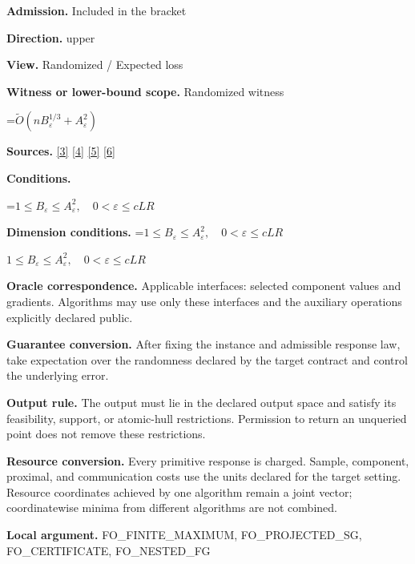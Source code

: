 \documentclass[10pt,a4paper]{article}
\newcommand{\AtlasMath}[1]{\par\begingroup\centering\setbox0=\hbox{$\displaystyle #1$}\ifdim\wd0>1.4\linewidth\typeout{ATLAS WIDE FORMULA: \the\wd0}\fi\ifdim\wd0>\linewidth\resizebox{\linewidth}{!}{\box0}\else\box0\fi\par\endgroup}
\newcommand{\AtlasInlineMath}[1]{\begingroup\setbox0=\hbox{$#1$}\ifdim\wd0>.4\linewidth\endgroup\AtlasMath{#1}\else\endgroup$#1$\fi}
\begin{document}
\textbf{Admission.} Included in the bracket



\textbf{Direction.} upper



\textbf{View.} Randomized / Expected loss



\textbf{Witness or lower-bound scope.} Randomized witness



\AtlasMath{\widetilde{O}(nB_\varepsilon^{1/3}+A_\varepsilon^2)}


\textbf{Sources.} \href{https://arxiv.org/pdf/2311.10886}{[3]} \href{https://arxiv.org/pdf/1405.4980}{[4]} \href{https://www2.isye.gatech.edu/~nemirovs/MOR_AccuracyCertificates.pdf}{[5]} \href{https://arxiv.org/pdf/2609.20701}{[6]}



\textbf{Conditions.}
\AtlasMath{1\le B_\varepsilon\le A_\varepsilon^2,\quad0<\varepsilon\le cLR}




\textbf{Dimension conditions.} \AtlasInlineMath{1\le B_\varepsilon\le A_\varepsilon^2,\quad0<\varepsilon\le cLR}



\textbf{Oracle correspondence.} Applicable interfaces: selected component values and gradients. Algorithms may use only these interfaces and the auxiliary operations explicitly declared public.



\textbf{Guarantee conversion.} After fixing the instance and admissible response law, take expectation over the randomness declared by the target contract and control the underlying error.



\textbf{Output rule.} The output must lie in the declared output space and satisfy its feasibility, support, or atomic-hull restrictions. Permission to return an unqueried point does not remove these restrictions.



\textbf{Resource conversion.} Every primitive response is charged. Sample, component, proximal, and communication costs use the units declared for the target setting. Resource coordinates achieved by one algorithm remain a joint vector; coordinatewise minima from different algorithms are not combined.



\textbf{Local argument.} FO\_FINITE\_MAXIMUM, FO\_PROJECTED\_SG, FO\_CERTIFICATE, FO\_NESTED\_FG
\end{document}
